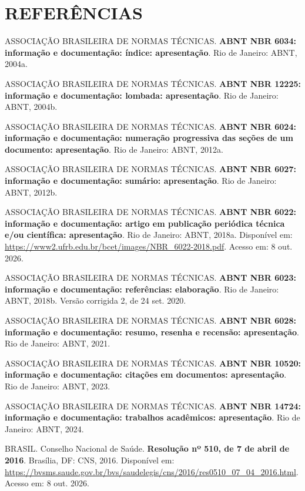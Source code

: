 \clearpage\section*{\centering REFERÊNCIAS}
\begin{singlespace}\setlength{\parindent}{0pt}\setlength{\parskip}{\baselineskip}\raggedright
ASSOCIAÇÃO BRASILEIRA DE NORMAS TÉCNICAS. \textbf{ABNT NBR 6034: informação e documentação: índice: apresentação}. Rio de Janeiro: ABNT, 2004a.

ASSOCIAÇÃO BRASILEIRA DE NORMAS TÉCNICAS. \textbf{ABNT NBR 12225: informação e documentação: lombada: apresentação}. Rio de Janeiro: ABNT, 2004b.

ASSOCIAÇÃO BRASILEIRA DE NORMAS TÉCNICAS. \textbf{ABNT NBR 6024: informação e documentação: numeração progressiva das seções de um documento: apresentação}. Rio de Janeiro: ABNT, 2012a.

ASSOCIAÇÃO BRASILEIRA DE NORMAS TÉCNICAS. \textbf{ABNT NBR 6027: informação e documentação: sumário: apresentação}. Rio de Janeiro: ABNT, 2012b.

ASSOCIAÇÃO BRASILEIRA DE NORMAS TÉCNICAS. \textbf{ABNT NBR 6022: informação e documentação: artigo em publicação periódica técnica e/ou científica: apresentação}. Rio de Janeiro: ABNT, 2018a. Disponível em: \url{https://www2.ufrb.edu.br/bcet/images/NBR_6022-2018.pdf}. Acesso em: 8 out. 2026.

ASSOCIAÇÃO BRASILEIRA DE NORMAS TÉCNICAS. \textbf{ABNT NBR 6023: informação e documentação: referências: elaboração}. Rio de Janeiro: ABNT, 2018b. Versão corrigida 2, de 24 set. 2020.

ASSOCIAÇÃO BRASILEIRA DE NORMAS TÉCNICAS. \textbf{ABNT NBR 6028: informação e documentação: resumo, resenha e recensão: apresentação}. Rio de Janeiro: ABNT, 2021.

ASSOCIAÇÃO BRASILEIRA DE NORMAS TÉCNICAS. \textbf{ABNT NBR 10520: informação e documentação: citações em documentos: apresentação}. Rio de Janeiro: ABNT, 2023.

ASSOCIAÇÃO BRASILEIRA DE NORMAS TÉCNICAS. \textbf{ABNT NBR 14724: informação e documentação: trabalhos acadêmicos: apresentação}. Rio de Janeiro: ABNT, 2024.

BRASIL. Conselho Nacional de Saúde. \textbf{Resolução nº 510, de 7 de abril de 2016}. Brasília, DF: CNS, 2016. Disponível em: \url{https://bvsms.saude.gov.br/bvs/saudelegis/cns/2016/res0510_07_04_2016.html}. Acesso em: 8 out. 2026.


\end{singlespace}
